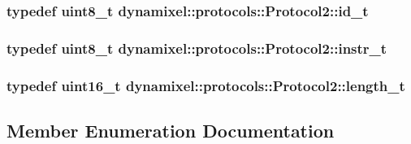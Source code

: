 \subsubsection[{\texorpdfstring{id\+\_\+t}{id_t}}]{\setlength{\rightskip}{0pt plus 5cm}typedef uint8\+\_\+t {\bf dynamixel\+::protocols\+::\+Protocol2\+::id\+\_\+t}}\hypertarget{classdynamixel_1_1protocols_1_1_protocol2_a38d9cae72cd86213cca74e718c240429}{}\label{classdynamixel_1_1protocols_1_1_protocol2_a38d9cae72cd86213cca74e718c240429}
\subsubsection[{\texorpdfstring{instr\+\_\+t}{instr_t}}]{\setlength{\rightskip}{0pt plus 5cm}typedef uint8\+\_\+t {\bf dynamixel\+::protocols\+::\+Protocol2\+::instr\+\_\+t}}\hypertarget{classdynamixel_1_1protocols_1_1_protocol2_aa7302f20356607bd51e4d4ecf4cb7abf}{}\label{classdynamixel_1_1protocols_1_1_protocol2_aa7302f20356607bd51e4d4ecf4cb7abf}
\subsubsection[{\texorpdfstring{length\+\_\+t}{length_t}}]{\setlength{\rightskip}{0pt plus 5cm}typedef uint16\+\_\+t {\bf dynamixel\+::protocols\+::\+Protocol2\+::length\+\_\+t}}\hypertarget{classdynamixel_1_1protocols_1_1_protocol2_a962ea2a3d9aa7e6ca7cee3e0c38ce383}{}\label{classdynamixel_1_1protocols_1_1_protocol2_a962ea2a3d9aa7e6ca7cee3e0c38ce383}


\subsection{Member Enumeration Documentation}
